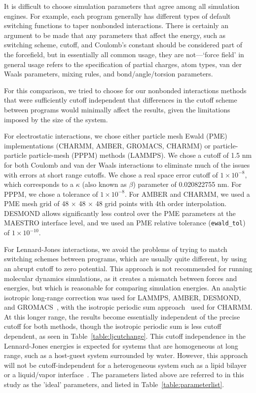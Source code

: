 It is difficult to choose simulation parameters that agree among all
simulation engines. For example, each program generally has different
types of default switching functions to taper nonbonded
interactions. There is certainly an argument to be made that any
parameters that affect the energy, such as switching scheme, cutoff,
and Coulomb's constant should be considered part of the forcefield,
but in essentially all common usage, they are not---`force field' in
general usage refers to the specification of partial charges, atom
types, van der Waals parameters, mixing rules, and bond/angle/torsion
parameters.

For this comparison, we tried to choose for our nonbonded
interactions methods that were sufficiently cutoff independent that
differences in the cutoff scheme between programs would minimally
affect the results, given the limitations imposed by the size of the
system.

For electrostatic interactions, we chose either particle mesh Ewald
(PME) implementations (CHARMM, AMBER, GROMACS, CHARMM) or
particle-particle particle-mesh (PPPM) methods (LAMMPS). We chose a
cutoff of 1.5 nm for both Coulomb and van der Waals interactions to
eliminate much of the issues with errors at short range cutoffs. We
chose a real space error cutoff of $1\times 10^{-8}$, which corresponds
to a $\kappa$ (also known as $\beta$) parameter of 0.020822755 nm.  For PPPM, we
chose a tolerance of $1\times10^{-8}$. For AMBER and
CHARMM, we used a PME mesh grid of 48 $\times$ 48 $\times$ 48 grid
points with 4th order interpolation. DESMOND allows significantly less
control over the PME parameters at the MAESTRO interface level, and we
used an PME relative tolerance ({\tt ewald\_tol}) of $1\times 10^{-10}$. 

For Lennard-Jones interactions, we avoid the problems of trying to
match switching schemes between programs, which are usually quite
different, by using an abrupt cutoff to zero potential. This approach
is not recommended for running molecular dynamics simulations, as it
creates a mismatch between forces and energies, but which is
reasonable for comparing simulation energies. An analytic isotropic
long-range correction was used for LAMMPS, AMBER, DESMOND, and
GROMACS~\citep{AllenAndTildesley,shirts_accurate_2007}, with the
isotropic periodic sum approach~\citep{wu_isotropic_2005} used for
CHARMM.  At this longer range, the results become essentially
independent of the precise cutoff for both methods, though the
isotropic periodic sum is less cutoff dependent, as seen in
Table~\ref{table:ljcutchange}. This cutoff independence in the
Lennard-Jones energies is expected for systems that are homogeneous at
long range, such as a host-guest system surrounded by water.  However,
this approach will not be cutoff-independent for a heterogeneous
system such as a lipid bilayer or a liquid/vapor
interface~\citep{veld_application_2007}. The parameters listed above
are referred to in this study as the 'ideal' parameters, and listed in
Table~\ref{table:parameterlist}.

